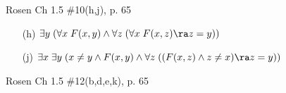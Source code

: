 \begin{questions}
\bonusquestion[4] Rosen Ch 1.5 \#10(h,j), p. 65
    \ifprintanswers
        \vspace{-12pt}
    \fi
  \begin{solution}
      \begin{itemize}[itemsep=0pt,parsep=0pt,topsep=0pt,partopsep=0pt]
         \item[(h)] $\exists y\; (\forall x\; F(x,y) \wedge \forall z\; (\forall x\; F(x,z) \ra z = y))$
         \item[(j)] $\exists x\; \exists y\; (x \neq y \wedge F(x,y) \wedge \forall z\; ((F(x,z) \wedge z \neq x) \ra z = y))$
      \end{itemize}
  \end{solution}


 Rosen Ch 1.5 \#12(b,d,e,k), p. 65
    \ifprintanswers
        \vspace{-12pt}
    \fi
  \begin{solution}

\end{solution}
\end{questions}
